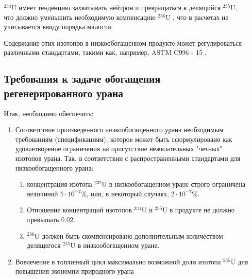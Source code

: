$^{234}$U имеет тенденцию захватывать нейтрон и превращаться в делящийся $^{235}$U, что должно уменьшить необходимую компенсацию $^{236}$U \cite{dyachenkoIspolzovanieRegenerirovannogoUrana2012}, что в расчетах не учитывается ввиду порядка малости.

Содержание этих изотопов в низкообогащенном продукте может регулироваться различными стандартами, такими как, например, ASTM C996 - 15 \cite{c26committeeSpecificationUraniumHexafluoride}.

\subsection{Требования к задаче обогащения регенерированного урана}

Итак, необходимо обеспечить:
\begin{enumerate}
  \item Соответствие произведенного низкообогащенного урана необходимым требованиям (спецификациям), которое может быть сформулировано как удовлетворение ограничения на присутствие нежелательных "четных" изотопов урана. Так, в соответствии с распространенными стандартами для низкообогащенного урана:
  \begin{enumerate}
    \item концентрация изотопа $^{232}$U в низкообогащенном уране строго ограничена величиной $5\cdot10^{-7}$\%, или, в некоторый случаях, $2\cdot10^{-7}$\%.
    \item Отношение концентраций изотопов $^{234}$U и $^{235}$U в продукте не должно превышать 0.02.
    \item $^{236}$U должен быть скомпенсировано дополнительным количеством делящегося $^{235}$U в низкообогащенном уране.
  \end{enumerate}
  \item Вовлечение в топливный цикл максимально возможной доли изотопа $^{235}$U для повышения экономии природного урана
\end{enumerate}

